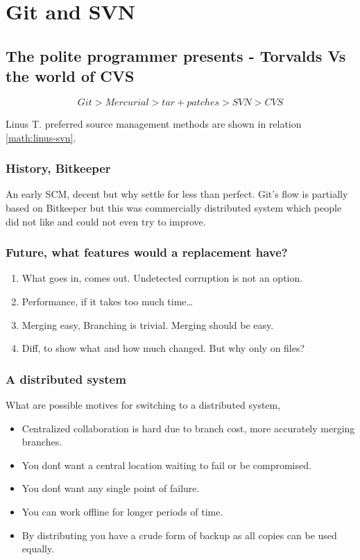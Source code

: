 
\section{Git and SVN}
\label{sect:leen}
\subsection{The polite programmer presents - Torvalds Vs the world of CVS}

\[
Git >  Mercurial > tar+patches > SVN > CVS
\label{math:linus-svn}
\]

Linus T. preferred source management methods are shown in relation \ref{math:linus-svn}.


\subsubsection{History, Bitkeeper}
An early SCM, decent but why settle for less than perfect.
Git's flow is partially based on Bitkeeper but this was commercially distributed system which people did not like and could not even try to improve.

\subsubsection{Future, what features would a replacement have?}

\begin{enumerate}
  \item What goes in, comes out. Undetected corruption is not an option.
  \item Performance, if it takes too much time\ldots
  \item Merging easy, Branching is trivial. Merging should be easy.
  \item Diff, to show what and how much changed. But why only on files?
\end{enumerate}

\subsubsection{A distributed system}
What are possible motives for switching to a distributed system,
\begin{itemize}
 \item Centralized collaboration is hard due to branch cost, more accurately merging branches.
 \item You don\'t want a central location waiting to fail or be compromised.
 \item You don\'t want any single point of failure.
 \item You can work offline for longer periods of time.
 \item By distributing you have a crude form of backup as all copies can be used equally.
\end{itemize}

